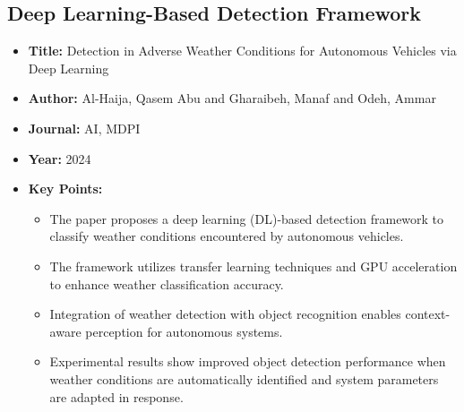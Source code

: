 \subsection{Deep Learning-Based Detection Framework}
\begin{itemize}
    \item \textbf{Title:} Detection in Adverse Weather Conditions for Autonomous Vehicles via Deep Learning \cite{al2022detection}
    \item \textbf{Author:} Al-Haija, Qasem Abu and Gharaibeh, Manaf and Odeh, Ammar
    \item \textbf{Journal:} AI, MDPI
    \item \textbf{Year:} 2024
    \item \textbf{Key Points:}
    \begin{itemize}
        \item The paper proposes a deep learning (DL)-based detection framework to classify weather conditions encountered by autonomous vehicles.
        \item The framework utilizes transfer learning techniques and GPU acceleration to enhance weather classification accuracy.
        \item Integration of weather detection with object recognition enables context-aware perception for autonomous systems.
        \item Experimental results show improved object detection performance when weather conditions are automatically identified and system parameters are adapted in response.
    \end{itemize}
\end{itemize}

